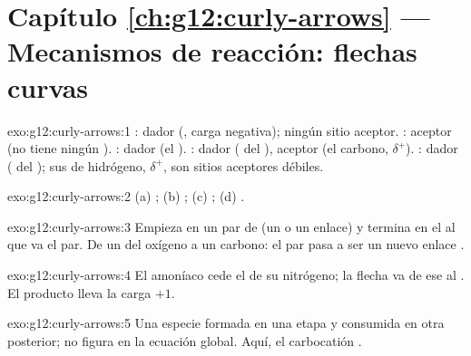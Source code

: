 \section*{Capítulo \ref{ch:g12:curly-arrows} --- Mecanismos de reacción: flechas curvas}

\begin{solution}{exo:g12:curly-arrows:1}
: dador (, carga negativa); ningún sitio aceptor.
: aceptor (no tiene ningún ). : dador (el
). : dador ( del ), aceptor (el
carbono, $\delta^+$). : dador ( del ); sus
 de hidrógeno, $\delta^+$, son sitios aceptores débiles.
\end{solution}

\begin{solution}{exo:g12:curly-arrows:2}
(a) ; (b) ; (c) ; (d) .
\end{solution}

\begin{solution}{exo:g12:curly-arrows:3}
Empieza en un par de  (un  o un enlace) y termina en
el  al que va el par. De un  del oxígeno a un carbono: el
par pasa a ser un nuevo enlace .
\end{solution}

\begin{solution}{exo:g12:curly-arrows:4}
El amoníaco cede el  de su nitrógeno; la flecha va de ese  al . El producto  lleva la carga $+1$.
\end{solution}

\begin{solution}{exo:g12:curly-arrows:5}
Una especie formada en una etapa y consumida en otra posterior; no
figura en la ecuación global. Aquí, el carbocatión .
\end{solution}

